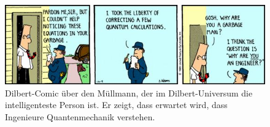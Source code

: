 %
%
%
\begin{figure}
\centering
\includegraphics[width=\textwidth]{chapters/040-felder/images/Garbageman.png}
\caption{Dilbert-Comic über den Müllmann, der im Dilbert-Universum die
intelligenteste Person ist.
Er zeigt, dass erwartet wird, dass Ingenieure Quantenmechanik verstehen.
\label{buch:felder:fig:garbageman}}
\end{figure}
